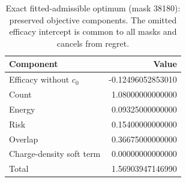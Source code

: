 \begin{table}[htbp]\centering
\caption{Exact fitted-admissible optimum (mask 38180): preserved objective components. The omitted efficacy intercept is common to all masks and cancels from regret.}\label{tab:components}
\small
\setlength{\tabcolsep}{4pt}
\begin{tabular}{lr}\toprule
Component & Value \\ \midrule
Efficacy without $c_0$ & -0.12496052853010 \\
Count & 1.08000000000000 \\
Energy & 0.09325000000000 \\
Risk & 0.15400000000000 \\
Overlap & 0.36675000000000 \\
Charge-density soft term & 0.00000000000000 \\
Total & 1.56903947146990 \\
\bottomrule\end{tabular}
\end{table}
